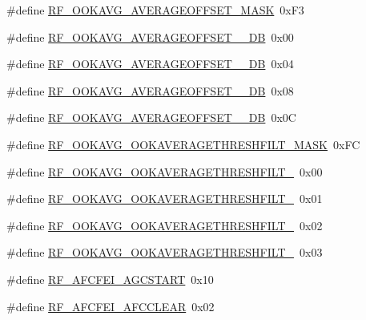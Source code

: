 \begin{DoxyCompactItemize}
\item 
\#define \hyperlink{sx1276Regs-Fsk_8h_ae287b34581e54ad15dfa43345e246722}{R\+F\+\_\+\+O\+O\+K\+A\+V\+G\+\_\+\+A\+V\+E\+R\+A\+G\+E\+O\+F\+F\+S\+E\+T\+\_\+\+M\+A\+SK}~0x\+F3
\item 
\#define \hyperlink{sx1276Regs-Fsk_8h_ab6d2934dbc04c61e6c03217796bfbde9}{R\+F\+\_\+\+O\+O\+K\+A\+V\+G\+\_\+\+A\+V\+E\+R\+A\+G\+E\+O\+F\+F\+S\+E\+T\+\_\+\_\+\+DB}~0x00
\item 
\#define \hyperlink{sx1276Regs-Fsk_8h_a1bcf452b92ad86f1bf5d1876bf3764cf}{R\+F\+\_\+\+O\+O\+K\+A\+V\+G\+\_\+\+A\+V\+E\+R\+A\+G\+E\+O\+F\+F\+S\+E\+T\+\_\+\_\+\+DB}~0x04
\item 
\#define \hyperlink{sx1276Regs-Fsk_8h_a0ad417387089ff60df572ff0caea31e3}{R\+F\+\_\+\+O\+O\+K\+A\+V\+G\+\_\+\+A\+V\+E\+R\+A\+G\+E\+O\+F\+F\+S\+E\+T\+\_\+\_\+\+DB}~0x08
\item 
\#define \hyperlink{sx1276Regs-Fsk_8h_a01d49f7bf297e19573e597c1cea201b3}{R\+F\+\_\+\+O\+O\+K\+A\+V\+G\+\_\+\+A\+V\+E\+R\+A\+G\+E\+O\+F\+F\+S\+E\+T\+\_\+\_\+\+DB}~0x0C
\item 
\#define \hyperlink{sx1276Regs-Fsk_8h_a7692c2da6c19d0727a2514eb98b7084d}{R\+F\+\_\+\+O\+O\+K\+A\+V\+G\+\_\+\+O\+O\+K\+A\+V\+E\+R\+A\+G\+E\+T\+H\+R\+E\+S\+H\+F\+I\+L\+T\+\_\+\+M\+A\+SK}~0x\+FC
\item 
\#define \hyperlink{sx1276Regs-Fsk_8h_af32acaba93e5219170d91aa2f860f6f8}{R\+F\+\_\+\+O\+O\+K\+A\+V\+G\+\_\+\+O\+O\+K\+A\+V\+E\+R\+A\+G\+E\+T\+H\+R\+E\+S\+H\+F\+I\+L\+T\+\_}~0x00
\item 
\#define \hyperlink{sx1276Regs-Fsk_8h_af101871f4380dea2544b985a7d162347}{R\+F\+\_\+\+O\+O\+K\+A\+V\+G\+\_\+\+O\+O\+K\+A\+V\+E\+R\+A\+G\+E\+T\+H\+R\+E\+S\+H\+F\+I\+L\+T\+\_}~0x01
\item 
\#define \hyperlink{sx1276Regs-Fsk_8h_a33d6a5bc732f2f47f9f45b93c2d6b4a8}{R\+F\+\_\+\+O\+O\+K\+A\+V\+G\+\_\+\+O\+O\+K\+A\+V\+E\+R\+A\+G\+E\+T\+H\+R\+E\+S\+H\+F\+I\+L\+T\+\_}~0x02
\item 
\#define \hyperlink{sx1276Regs-Fsk_8h_a5f946cb672cf2b677e28758a94ce65dd}{R\+F\+\_\+\+O\+O\+K\+A\+V\+G\+\_\+\+O\+O\+K\+A\+V\+E\+R\+A\+G\+E\+T\+H\+R\+E\+S\+H\+F\+I\+L\+T\+\_}~0x03
\item 
\#define \hyperlink{sx1276Regs-Fsk_8h_a99a17d7febe804164dd9aabe561ca38b}{R\+F\+\_\+\+A\+F\+C\+F\+E\+I\+\_\+\+A\+G\+C\+S\+T\+A\+RT}~0x10
\item 
\#define \hyperlink{sx1276Regs-Fsk_8h_a30d3f06563697b523ac9d05ae193f40d}{R\+F\+\_\+\+A\+F\+C\+F\+E\+I\+\_\+\+A\+F\+C\+C\+L\+E\+AR}~0x02

\end{DoxyCompactItemize}
